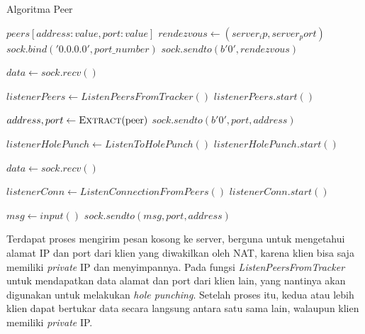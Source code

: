 \begin{algorithm}[H]
  \caption{Algoritma Peer}\label{alg:peer-to-peer}
  \begin{algorithmic}
    \State $peers[{address: value, port: value}]$ 
    \State $rendezvous \gets (server_ip, server_port) $
    \State $sock.bind('0.0.0.0', port\_number)$  
    \State $sock.sendto(b'0', rendezvous)$         

    \item[] %

        \State $data \gets sock.recv()$ 
        \State {}
      \EndWhile
    \EndFunction

    \State $listenerPeers \gets ListenPeersFromTracker()$
    \State $listenerPeers.start()$

    \item[] %

        \State $address, port \gets \Call{Extract}{$peer$} $ 
        \State $sock.sendto(b'0', port, address)$  
      \EndFor
    \EndFunction

    \State $listenerHolePunch \gets ListenToHolePunch()$
    \State $listenerHolePunch.start()$

    \item[] %

        \State $data \gets sock.recv()$  
      \EndWhile
    \EndFunction

    \State $listenerConn \gets ListenConnectionFromPeers()$
    \State $listenerConn.start()$

    \item[] %

      \State $msg \gets input()$ 
      \State $sock.sendto(msg, port, address)$ 
    \EndWhile
  \end{algorithmic}
\end{algorithm}

Terdapat proses mengirim pesan kosong ke server, berguna untuk mengetahui alamat IP dan port dari klien yang diwakilkan oleh NAT, karena klien bisa saja memiliki \emph{private} IP dan menyimpannya. Pada fungsi \emph{ListenPeersFromTracker} untuk mendapatkan data alamat dan port dari klien lain, yang nantinya akan digunakan untuk melakukan \emph{hole punching}. Setelah proses itu, kedua atau lebih klien dapat bertukar data secara langsung antara satu sama lain, walaupun klien memiliki \emph{private} IP.

